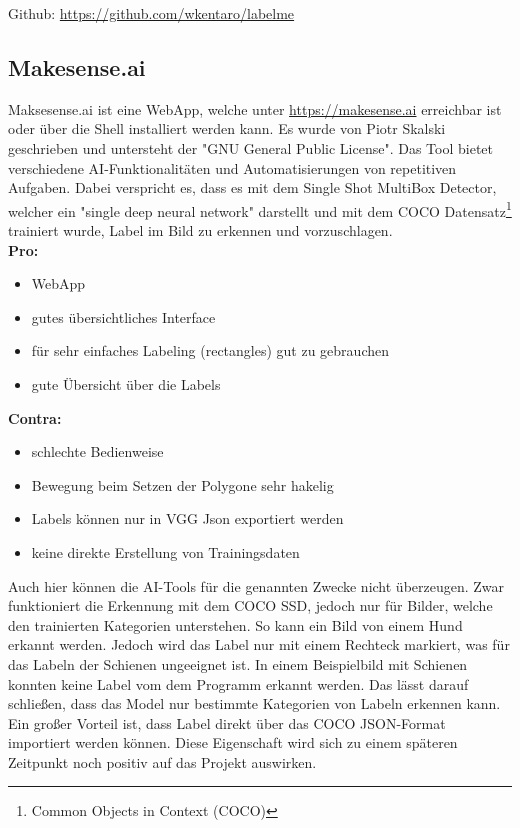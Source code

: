 \documentclass[11pt]{scrartcl}
\begin{document}
\noindent 
Github: \url{https://github.com/wkentaro/labelme} 
\newpage
\subsection{Makesense.ai}
\label{sec:Makesense.ai}

Maksesense.ai ist eine WebApp, welche unter \url{https://makesense.ai}  erreichbar ist oder über die Shell installiert werden kann. Es wurde von Piotr Skalski geschrieben und untersteht der "GNU General Public License". Das Tool bietet verschiedene AI-Funktionalitäten und Automatisierungen von repetitiven Aufgaben. Dabei verspricht es, dass es mit dem Single Shot MultiBox Detector, welcher ein "single deep neural network" darstellt und mit dem COCO Datensatz\footnote{Common Objects in Context (COCO)} trainiert wurde, Label im Bild zu erkennen und vorzuschlagen. 
\\

\textbf{Pro:} 
\begin{itemize}
	\item WebApp
	\item gutes übersichtliches Interface
	\item für sehr einfaches Labeling (rectangles) gut zu gebrauchen
	\item gute Übersicht über die Labels
\end{itemize}
\textbf{Contra:} 
\begin{itemize}
	\item schlechte Bedienweise
	\item Bewegung beim Setzen der Polygone sehr hakelig
	\item Labels können nur in VGG Json exportiert werden
	\item keine direkte Erstellung von Trainingsdaten
\end{itemize}

\noindent
Auch hier können die AI-Tools für die genannten Zwecke nicht überzeugen. Zwar funktioniert die Erkennung mit dem COCO SSD, jedoch nur für Bilder, welche den trainierten Kategorien unterstehen. So kann ein Bild von einem Hund erkannt werden. Jedoch wird das Label nur mit einem Rechteck markiert, was für das Labeln der Schienen ungeeignet ist. In einem Beispielbild mit Schienen konnten keine Label vom dem Programm erkannt werden. Das lässt darauf schließen, dass das Model nur bestimmte Kategorien von Labeln erkennen kann. Ein großer Vorteil ist, dass Label direkt über das COCO JSON-Format importiert werden können. Diese Eigenschaft wird sich zu einem späteren Zeitpunkt noch positiv auf das Projekt auswirken.
\end{document}

